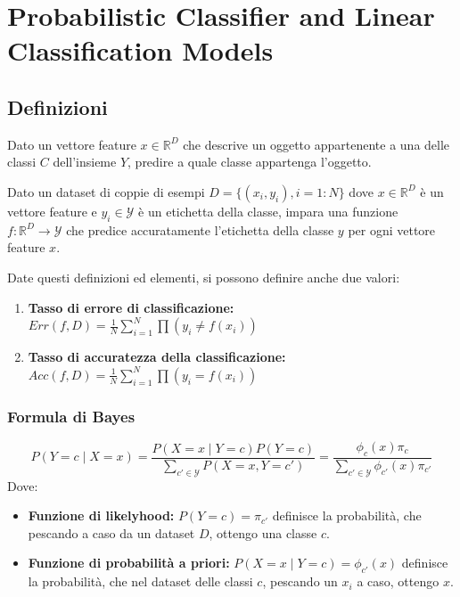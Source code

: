 \chapter{Probabilistic Classifier and Linear Classification Models}
\section{Definizioni}

\begin{defn}[Classificazione]
  Dato un vettore feature $x \in \mathbb{R}^D$ che descrive un oggetto appartenente a una delle classi $C$ dell'insieme $Y$, predire a quale classe appartenga l'oggetto.
\end{defn}

\begin{defn}
  Dato un dataset di coppie di esempi $D = \{(x_i, y_i), i = 1 : N\}$ dove $x \in \mathbb{R}^D$ è un vettore feature e $y_i \in \mathcal{Y}$ è un etichetta della classe, 
  impara una funzione $f : \mathbb{R}^D \rightarrow \mathcal{Y}$ che predice accuratamente l'etichetta della classe $y$ per ogni vettore feature $x$.
\end{defn}

Date questi definizioni ed elementi, si possono definire anche due valori:
\begin{enumerate}
  \item \textbf{Tasso di errore di classificazione:} $Err(f, D) = \frac{1}{N}\sum^N_{i=1}{\prod{(y_i \neq f(x_i))}}$
  \item \textbf{Tasso di accuratezza della classificazione:} $Acc(f, D) = \frac{1}{N}\sum^N_{i=1}{\prod{(y_i = f(x_i))}}$
\end{enumerate}

\subsection{Formula di Bayes}
\[
  P(Y = c \mid X = x) = \frac{P(X = x \mid Y = c) P(Y = c)}{\sum_{c' \in \mathcal{Y}} P(X = x, Y = c')} = \frac{\phi_c(x) \pi_c}{\sum_{c' \in \mathcal{Y}} \phi_{c'}(x) \pi_{c'}}
\]
Dove:
\begin{itemize}
  \item \textbf{Funzione di likelyhood:} $P(Y = c) = \pi_{c'}$ definisce la probabilità, che pescando a caso da un dataset $D$, ottengo una classe $c$.
  \item \textbf{Funzione di probabilità a priori: }$P(X = x \mid Y = c) = \phi_{c'}(x)$ definisce la probabilità, che nel dataset delle classi $c$, pescando un $x_i$ a caso, ottengo $x$. 
\end{itemize}

